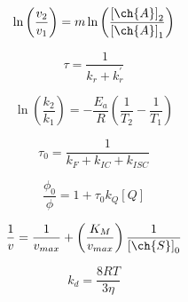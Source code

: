 \documentclass[12pt, letterpaper]{memoir}
\begin{document}
\begin{minipage}[t]{0.5\linewidth}
	\begin{equation*}
		\ln\left(\frac{v_2}{v_1}\right)=m\ln\left(\frac{\left[\ch{A}\right]_2}{\left[\ch{A}\right]_1}\right)
	\end{equation*}

	\begin{equation*}
		\tau = \dfrac{1}{k_r + k_r^\prime}
	\end{equation*}

	\begin{equation*}
		\ln\left(\frac{k_2}{k_1}\right)=-\frac{E_a}{R}\left(\frac{1}{T_2}-\frac{1}{T_1}\right)
	\end{equation*}

	\begin{equation*}
		\tau_0=\dfrac{1}{k_F+k_{IC}+k_{ISC}}
	\end{equation*}

	\begin{equation*}
		\dfrac{\phi_{0}}{\phi} = 1 + \tau_0k_Q[Q]
	\end{equation*}

	\begin{equation*}
		\frac{1}{v}=\frac{1}{v_{max}}+\left(\frac{K_M}{v_{max}}\right)\frac{1}{\left[\ch{S}\right]_0}
	\end{equation*}

	\begin{equation*}
		k_d=\dfrac{8RT}{3\eta}
	\end{equation*}

\end{minipage}
\end{document}
